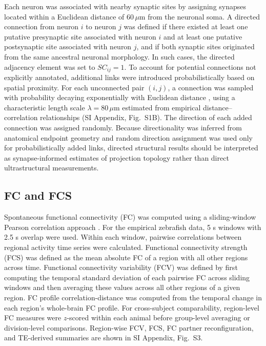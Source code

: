 \documentclass[9pt,twocolumn,twoside]{pnas-new}
\begin{document}
{Each neuron was associated with nearby synaptic sites by assigning synapses located within a Euclidean distance of $60\,\mu$m from the neuronal soma. A directed connection from neuron $i$ to neuron $j$ was defined if there existed at least one putative presynaptic site associated with neuron $i$ and at least one putative postsynaptic site associated with neuron $j$, and if both synaptic sites originated from the same ancestral neuronal morphology. In such cases, the directed adjacency element was set to $SC_{ij}= 1$. To account for potential connections not explicitly annotated, additional links were introduced probabilistically based on spatial proximity. For each unconnected pair $(i,j)$, a connection was sampled with probability decaying exponentially with Euclidean distance \citep{Kaiser2006Nonoptimal,Betzel2016Distance}, using a characteristic length scale $\lambda= 80\,\mu$m estimated from empirical distance--correlation relationships (SI Appendix, Fig.~S1B). The direction of each added connection was assigned randomly. Because directionality was inferred from anatomical endpoint geometry and random direction assignment was used only for probabilistically added links, directed structural results should be interpreted as synapse-informed estimates of projection topology rather than direct ultrastructural measurements.

\subsection*{FC and FCS}

Spontaneous functional connectivity (FC) was computed using a sliding-window Pearson correlation approach \citep{allen2014tracking,elton2015task}. For the empirical zebrafish data, 5 s windows with 2.5 s overlap were used. Within each window, pairwise correlations between regional activity time series were calculated. Functional connectivity strength (FCS) was defined as the mean absolute FC of a region with all other regions across time. Functional connectivity variability (FCV) was defined by first computing the temporal standard deviation of each pairwise FC across sliding windows and then averaging these values across all other regions of a given region. FC profile correlation-distance was computed from the temporal change in each region's whole-brain FC profile. For cross-subject comparability, region-level FC measures were $z$-scored within each animal before group-level averaging or division-level comparisons.
Region-wise FCV, FCS, FC partner reconfiguration, and TE-derived summaries are shown in SI Appendix, Fig.~S3.

}
\end{document}
